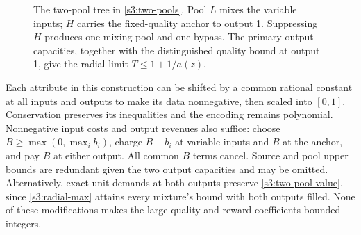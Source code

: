 \begin{figure}[htbp]
\centering
{}
\caption{The two-pool tree in \cref{s3:two-pools}. Pool $L$ mixes the
variable inputs; $H$ carries the fixed-quality anchor to output 1.
Suppressing $H$ produces one mixing pool and one bypass. The primary
output capacities, together with the distinguished quality bound at
output 1, give the radial limit $T\le1+1/a(z)$.}
\label{s3:tree-figure}
\end{figure}

Each attribute in this construction can be shifted by a common rational
constant at all inputs and outputs to make its data nonnegative, then
scaled into $[0,1]$. Conservation preserves its inequalities and the
encoding remains polynomial. Nonnegative input costs and output revenues
also suffice: choose $B\ge\max(0,\max_i b_i)$, charge $B-b_i$ at
variable inputs and $B$ at the anchor, and pay $B$ at either output.
All common $B$ terms cancel. Source and pool upper bounds are redundant
given the two output capacities and may be omitted. Alternatively, exact
unit demands at both outputs preserve \eqref{s3:two-pool-value}, since
\eqref{s3:radial-max} attains every mixture's bound with both outputs
filled. None of these modifications makes the large quality and reward
coefficients bounded integers.

